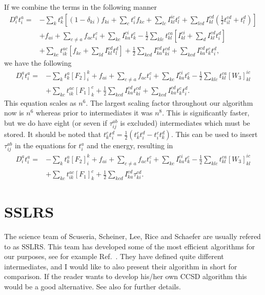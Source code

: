 \documentclass[a4paper,norsk,11pt,twoside]{report}
\begin{document}
If we combine the terms in the following manner
\begin{align}
D_i^a t_i^a = &
- \sum_{k} t_k^a
\left[
(1 - \delta_{ki}) f_{ki}
+ \sum_c t_i^c
f_{kc}
+ \sum_{lc} I_{kl}^{ic} t_l^c
+ \sum_{lcd} I_{kl}^{cd} (\frac{1}{2} t_{il}^{cd} + t_l^d)
\right]
\nonumber \\ &
+ f_{ai} 
+ \sum_{c \not= a} f_{ac} t_i^c
+ \sum_{kc} I_{ka}^{ci} t_k^c 
- \frac{1}{2} \sum_{klc} t_{kl}^{ca}
\left[
I_{kl}^{ci} + \sum_d I_{kl}^{cd} t_i^d
\right]
\nonumber \\ &
+ \sum_{kc} t_{ik}^{ac} 
\left[
f_{kc} + \sum_{ld} I_{kl}^{cd} t_l^d
\right]
+ \frac{1}{2} \sum_{kcd} I_{ka}^{cd} t_{ki}^{cd} 
+ \sum_{kcd} I_{ka}^{cd} t_k^c t_i^d,
\end{align}
we have the following
\begin{align}
D_i^a t_i^a = &
- \sum_{k} t_k^a
[F_2]_i^k
+ f_{ai} 
+ \sum_{c \not= a} f_{ac} t_i^c
+ \sum_{kc} I_{ka}^{ci} t_k^c 
- \frac{1}{2} \sum_{klc} t_{kl}^{ca} [W_3]_{kl}^{ic}
\nonumber \\ &
+ \sum_{kc} t_{ik}^{ac} [F_1]_k^c
+ \frac{1}{2} \sum_{kcd} I_{ka}^{cd} t_{ki}^{cd} 
+ \sum_{kcd} I_{ka}^{cd} t_k^c t_i^d 
 .
\end{align}
This equation scales as $n^6$. The largest scaling factor throughout
our algorithm now is $n^6$ whereas prior to intermediates it was
$n^8$. This is significantly faster, but we do have eight (or seven if
$\tau_{ij}^{ab}$ is excluded) intermediates which must be stored. It
should be noted that $t_k^c t_i^d = \frac{1}{2} (t_k^c t_i^d - t_i^c
t_k^d)$. This can be used to insert $\tau_{ij}^{ab}$ in the equations
for $t_i^a$ and the energy, resulting in
\begin{align}
D_i^a t_i^a = &
- \sum_{k} t_k^a
[F_2]_i^k
+ f_{ai} 
+ \sum_{c \not= a} f_{ac} t_i^c
+ \sum_{kc} I_{ka}^{ci} t_k^c 
- \frac{1}{2} \sum_{klc} t_{kl}^{ca} [W_3]_{kl}^{ic}
\nonumber \\ &
+ \sum_{kc} t_{ik}^{ac} [F_1]_k^c
+ \frac{1}{2} \sum_{kcd} I_{ka}^{cd} \tau_{ki}^{cd} 
.  \label{LINK_THIS_SHIT_1_T1}
\end{align}

\section{SSLRS}

The science team of Scuseria, Scheiner, Lee, Rice and Schaefer are
usually refered to as SSLRS. This team has developed some of the most
efficient algorithms for our purposes, see for example Ref.~\cite{sslrs_citation2}. They
have defined quite different intermediates, and I would like to also
present their algorithm in short for comparison. If the reader wants to
develop his/her own CCSD algorithm this would be a good alternative. See
also \cite{sslrs_citation1} for further details.
\end{document}
